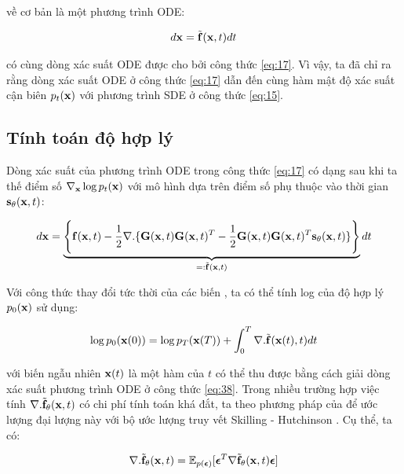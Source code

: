 \documentclass{article} %
\begin{document}
về cơ bản là một phương trình ODE:

\begin{equation*}
    d \bold{x} = \tilde{\bold{f}}(\bold{x}, t) dt
\end{equation*}

có cùng dòng xác suất ODE được cho bởi công thức \ref{eq:17}.
Vì vậy, ta đã chỉ ra rằng dòng xác suất ODE ở công thức \ref{eq:17} dẫn đến cùng hàm mật độ xác suất cận biên $p_t(\bold{x})$ với phương trình SDE ở công thức \ref{eq:15}.

\subsection{Tính toán độ hợp lý} \label{D.2}

Dòng xác suất của phương trình ODE trong công thức \ref{eq:17} có dạng sau khi ta thế điểm số $\nabla_{\bold{x}} \log p_t (\bold{x})$ với mô hình dựa trên điểm số phụ thuộc vào thời gian $\bold{s}_{\bold{\theta}}(\bold{x}, t)$:

\begin{equation} \label{eq:38}
    d \bold{x} = \underbrace{\Bigg \lbrace \bold{f}(\bold{x}, t) - \dfrac{1}{2} \nabla . \lbrace \bold{G}(\bold{x}, t) \bold{G}(\bold{x}, t)^T - \dfrac{1}{2} \bold{G}(\bold{x}, t) \bold{G}(\bold{x}, t)^T \bold{s}_{\bold{\theta}} (\bold{x}, t) \rbrace \Bigg \rbrace}_{=: \tilde{\bold{f}}(\bold{x}, t)} dt
\end{equation}

Với công thức thay đổi tức thời của các biến \citep{chen2018neural}, ta có thể tính log của độ hợp lý $p_0 (\bold{x})$ sử dụng:

\begin{equation} \label{eq:39}
    \log p_0 (\bold{x}(0)) = \log p_T (\bold{x}(T)) + \int_{0}^{T} \nabla . \tilde{\bold{f}}(\bold{x}(t), t) dt
\end{equation}

với biến ngẫu nhiên $\bold{x}(t)$ là một hàm của $t$ có thể thu được bằng cách giải dòng xác suất phương trình ODE ở công thức \ref{eq:38}.
Trong nhiều trường hợp việc tính $\nabla . \tilde{\bold{f}}_{\bold{\theta}}(\bold{x}, t)$ có chi phí tính toán khá đắt, ta theo phương pháp của \citep{grathwohl2018ffjord} để ước lượng đại lượng này với bộ ước lượng truy vết Skilling - Hutchinson \citep{skilling1989eigenvalues,hutchinson1989stochastic}.
Cụ thể, ta có:

\begin{equation} \label{eq:40}
    \nabla . \tilde{\bold{f}}_{\bold{\theta}}(\bold{x}, t) = \mathbb{E}_{p(\boldsymbol{\epsilon})} \lbrack \boldsymbol{\epsilon}^T \nabla \tilde{\bold{f}}_{\bold{\theta}} (\bold{x}, t) \boldsymbol{\epsilon} \rbrack
\end{equation}
\end{document}
